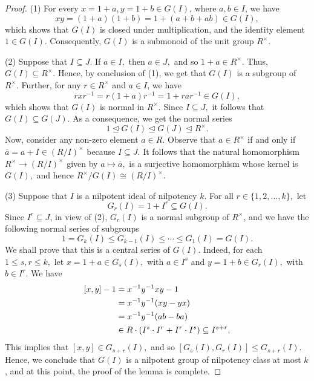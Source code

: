\documentclass{amsart}
\theoremstyle{definition}
\begin{document}
\begin{proof} (1) For every $x=1+a, y=1+b\in G(I)$, where $a,b\in I$, we have
 $$xy=(1+a)(1+b)=1+(a+b+ab)\in G(I),$$	
which shows that $G(I)$ is closed under multiplication, and the identity element $1\in G(I).$ Consequently, $G(I)$ is a submonoid of the unit group $R^\times.$

(2) Suppose that $I\subseteq J$. If $a\in I,$ then $a\in J,$ and so $1+a\in R^\times.$ Thus, $G(I)\subseteq R^\times.$ Hence, by conclusion of (1), we get that $G(I)$ is a subgroup of $R^\times$. Further, for any $r\in R^\times$ and $a\in I$, we have
$$rxr^{-1}=r(1+a)r^{-1}=1+rar^{-1}\in G(I),$$ which shows that $G(I)$ is normal in $R^\times.$ Since $I\subseteq J,$ it follows that $G(I)\subseteq G(J).$ As a consequence, we get the normal series 
	$$1\trianglelefteq G(I)\trianglelefteq G(J)\trianglelefteq R^\times.$$
Now, consider any non-zero element $a\in R$. Observe that $a\in R^\times$ if and only if $\overline{a}=a+I\in (R/I)^\times$ because $I\subseteq J$. It follows that the natural homomorphism $R^\times\longrightarrow (R/I)^\times$ given by $a\mapsto \overline{a},$ is a surjective homomorphism whose kernel is $G(I),$ and hence $R^\times/G(I)\cong (R/I)^\times.$
		
(3) Suppose that $I$ is a nilpotent ideal of nilpotency $k$. For all $r\in \{1,2,\ldots,k\},$ let $$G_r(I)=1+I^r\subseteq G(I).$$
Since $I^r\subseteq J$, in view of (2), $G_r(I)$ is a normal subgroup of $R^\times$, and we have the following  normal series of subgroups
$$1=G_k(I)\le G_{k-1}(I)\le\cdots\le G_1(I)=G(I).$$
We shall prove that this is a central series of $G(I)$. Indeed, for each $1\leq s, r\leq k,$ let $x=1+a\in G_s(I),$ with $a\in I^s$ and $y=1+b\in G_r(I),$ with $b\in I^r.$ We have
	\begin{gather}
		\begin{split}
			[x,y]-1&=x^{-1}y^{-1}xy-1\\
			&=x^{-1}y^{-1}(xy-yx)\\
			&=x^{-1}y^{-1}(ab-ba)\\
			&\in R\cdot(I^s\cdot I^r+I^r\cdot I^s)\subseteq I^{s+r}.
		\end{split}\notag
	\end{gather}
	This implies that $[x,y]\in G_{s+r}(I),$ and so $[G_s(I),G_r(I)]\le G_{s+r}(I).$ Hence, we conclude that $G(I)$ is a nilpotent group of nilpotency class at most $k$, and at this point,  the proof of the lemma is  complete.
\end{proof}
\end{document}
